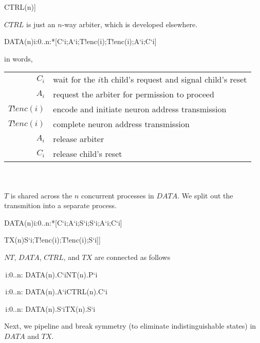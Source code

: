 \documentclass{article}
\begin{document}
\begin{csp}
CTRL(n)\equiv*[[\langle\|i:0..n\-1:#{C`i}->C`i;C`i]]
\end{csp}

\noindent $CTRL$ is just an $n$-way arbiter, which is developed elsewhere.

\begin{csp}
DATA(n)\equiv\langle\pll\!i:0..n:*[C`i;A`i;T!enc(i);T!enc(i);A`i;C`i]\rangle
\end{csp}

\noindent in words,

\begin{tabular}[]{rl}
  $C_i$ & wait for the $i$th child's request and signal child's reset \\
  $A_i$ & request the arbiter for permission to proceed \\
  $T!enc(i)$ & encode and initiate neuron address transmission \\
  $T!enc(i)$ & complete neuron address transmission \\
  $A_i$ & release arbiter \\
  $C_i$ & release child's reset \\
\end{tabular} \\ \\

\noindent $T$ is shared across the $n$ concurrent processes in $DATA$. We split out the transmition into a separate process.

\begin{csp}
DATA(n)\equiv\langle\pll\!i:0..n:*[C`i;A`i;S`i;S`i;A`i;C`i]\rangle
\end{csp}

\begin{csp}
TX(n)\equiv*[[\langle[]S`i;T!enc(i);T!enc(i);S`i\rangle]]
\end{csp}

\noindent $NT$, $DATA$, $CTRL$, and $TX$ are connected as follows

\begin{csp}
\langle\,i:0..n:
  DATA(n).C`i\Leftrightarrow\!NT(n).P`i\rangle

\langle\,i:0..n:
  DATA(n).A`i\Leftrightarrow\!CTRL(n).C`i\rangle

\langle\,i:0..n:
  DATA(n).S`i\Leftrightarrow\!TX(n).S`i\rangle
\end{csp}

\noindent Next, we pipeline and break symmetry (to eliminate indistinguishable states) in $DATA$ and $TX$.
\end{document}
